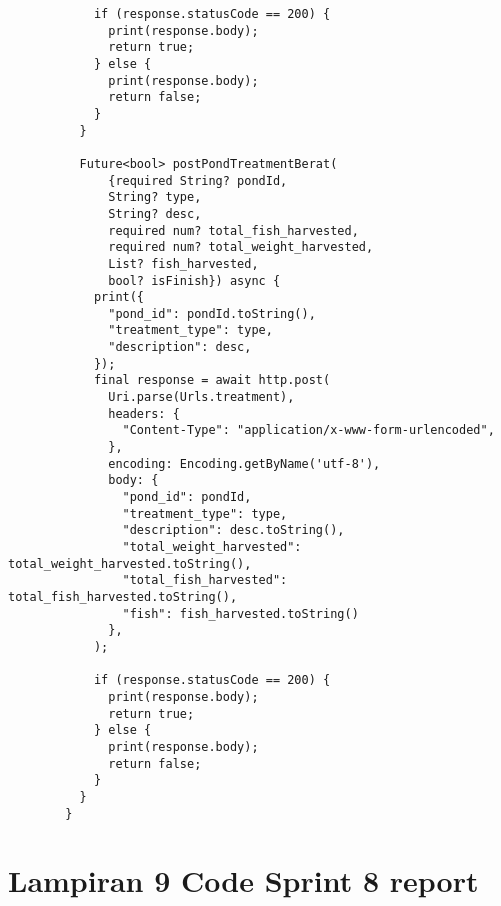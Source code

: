 \begin{lstlisting}
            if (response.statusCode == 200) {
              print(response.body);
              return true;
            } else {
              print(response.body);
              return false;
            }
          }
        
          Future<bool> postPondTreatmentBerat(
              {required String? pondId,
              String? type,
              String? desc,
              required num? total_fish_harvested,
              required num? total_weight_harvested,
              List? fish_harvested,
              bool? isFinish}) async {
            print({
              "pond_id": pondId.toString(),
              "treatment_type": type,
              "description": desc,
            });
            final response = await http.post(
              Uri.parse(Urls.treatment),
              headers: {
                "Content-Type": "application/x-www-form-urlencoded",
              },
              encoding: Encoding.getByName('utf-8'),
              body: {
                "pond_id": pondId,
                "treatment_type": type,
                "description": desc.toString(),
                "total_weight_harvested": total_weight_harvested.toString(),
                "total_fish_harvested": total_fish_harvested.toString(),
                "fish": fish_harvested.toString()
              },
            );
        
            if (response.statusCode == 200) {
              print(response.body);
              return true;
            } else {
              print(response.body);
              return false;
            }
          }
        }        
	\end{lstlisting}

	\clearpage
	\section{Lampiran 9 Code Sprint 8 report}

